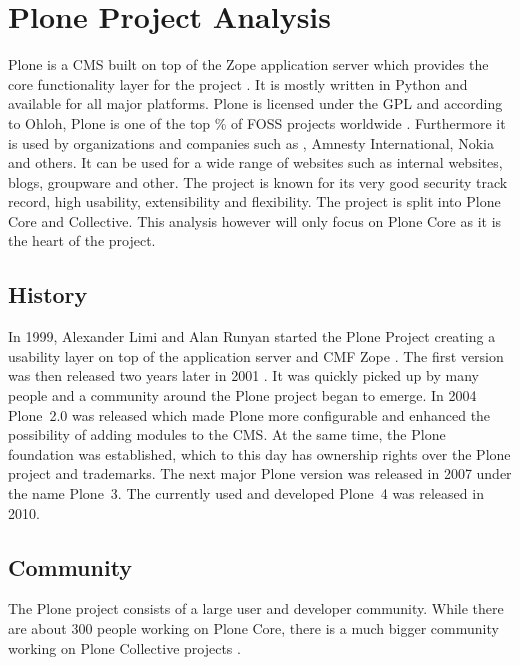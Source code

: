 \section{Plone Project Analysis} %


\noindent Plone is a \ac{CMS} built on top of the Zope application server which
provides the core functionality layer for the project
\cite{Aspeli2005,PloneFaq,PloneWhatIsPlone}. It is mostly written in Python and
available for all major platforms. Plone is licensed under the \ac{GPL} and
according to Ohloh, Plone is one of the top \unit[2]{\%} of \ac{FOSS} projects
worldwide \cite{PloneOhlohFactoids}. Furthermore it is used by organizations
and companies such as , Amnesty International, Nokia and
others. It can be used for a wide range of websites such as internal websites,
blogs, groupware and other. The project is known for its very good security
track record, high usability, extensibility and flexibility. The project is
split into Plone Core and Collective. This analysis however will only focus on
Plone Core as it is the heart of the project.

\subsection{History} %

In 1999, Alexander Limi and Alan Runyan started the Plone Project creating a
usability layer on top of the application server and \ac{CMF} Zope
\cite{Aspeli2005,PloneFaq}. The first version was then released two years later
in 2001 \cite{PloneReleases}. It was quickly picked up by many people and a
community around the Plone project began to emerge. In 2004 Plone~2.0 was
released which made Plone more configurable and enhanced the possibility of
adding modules to the \ac{CMS}. At the same time, the Plone foundation was
established, which to this day has ownership rights over the Plone project and
trademarks. The next major Plone version was released in 2007 under the name
Plone~3. The currently used and developed Plone~4 was released in 2010.


\subsection{Community} %

The Plone project consists of a large user and developer community. While there
are about 300 people working on Plone Core, there is a much bigger community
working on Plone Collective projects
\cite{Aspeli2005,PloneOhlohFactoids,PloneCommunityProcesses}.

